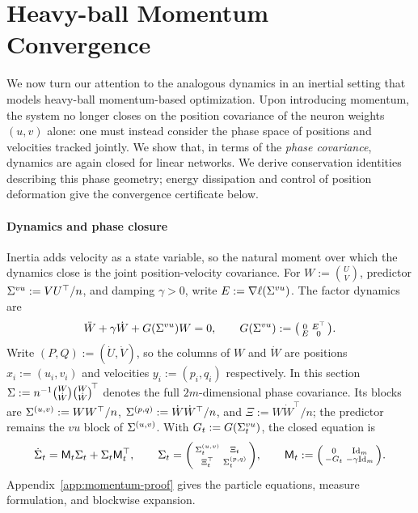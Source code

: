 \section{Heavy-ball Momentum Convergence}
\vspace{-0.5em}
\label{sec:momentum}
We now turn our attention to the analogous dynamics in an inertial setting that models heavy-ball momentum-based optimization.
Upon introducing momentum, the system no longer closes on the position covariance of the neuron weights \((u,v)\) alone: one must instead consider the phase space of positions and velocities tracked jointly.
We show that, in terms of the \emph{phase covariance}, dynamics are again closed for linear networks.
We derive conservation identities describing this phase geometry; energy dissipation and control of position deformation give the convergence certificate below.

\paragraph{Dynamics and phase closure}
Inertia adds velocity as a state variable, so the natural moment over which the dynamics close is the joint position-velocity covariance.
For $W:=\binom UV$, predictor $\Sigma^{vu}:=VU^\top/n$, and damping $\gamma>0$,
write $E:=\nabla\ell(\Sigma^{vu})$. The factor dynamics are
\begin{equation}\label{eq:finite-momentum}
 \ddot W+\gamma\dot W+G(\Sigma^{vu})W=0,\qquad
 G(\Sigma^{vu}):=\begin{psmallmatrix}0&E^\top\\E&0\end{psmallmatrix}.
\end{equation}
Write $(P,Q):=(\dot U,\dot V)$, so the columns of $W$ and $\dot W$ are
positions $x_i:=(u_i,v_i)$ and velocities $y_i:=(p_i,q_i)$ respectively.
In this section $\Sigma:=n^{-1}\binom W{\dot W}\binom W{\dot W}^{\!\top}$
denotes the full $2m$-dimensional phase covariance. Its blocks are
$\Sigma^{(u,v)}:=WW^\top/n$, $\Sigma^{(p,q)}:=\dot W\dot W^\top/n$, and
$\Xi:=W\dot W^\top/n$; the predictor remains the $vu$ block of $\Sigma^{(u,v)}$.
With $G_t:=G(\Sigma^{vu}_t)$, the closed equation is
\begin{equation}\label{eq:phase}
 \dot{\Sigma}_t=\mathsf M_t\Sigma_t+\Sigma_t\mathsf M_t^\top,\qquad
 \Sigma_t=\begin{psmallmatrix}\Sigma^{(u,v)}_t&\Xi_t\\\Xi_t^\top&\Sigma^{(p,q)}_t\end{psmallmatrix},\qquad
 \mathsf M_t:=\begin{psmallmatrix}0&\mathrm{Id}_m\\-G_t&-\gamma\mathrm{Id}_m\end{psmallmatrix}.
\end{equation}
Appendix~\ref{app:momentum-proof} gives the particle equations, measure
formulation, and blockwise expansion.

